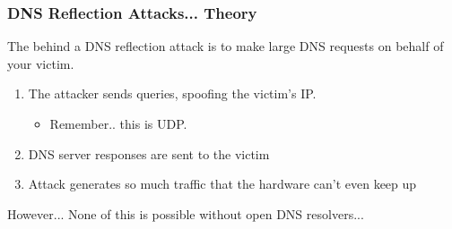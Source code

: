 \documentclass{beamer}
\begin{document}
\begin{frame}
	\frametitle{DNS Reflection Attacks... Theory}
	The behind a DNS reflection attack is to make {\Large large} DNS requests on
	behalf of your victim. 
	\begin{enumerate}
		\item The attacker sends queries, spoofing the victim's IP.  
			\begin{itemize}
				\item Remember.. this is UDP. 
			\end{itemize}
		\item DNS server responses are sent to the victim
		\item Attack generates so much traffic that the hardware can't even keep up
	\end{enumerate}
	However... None of this is possible without open DNS resolvers...
\end{frame}
\end{document}
